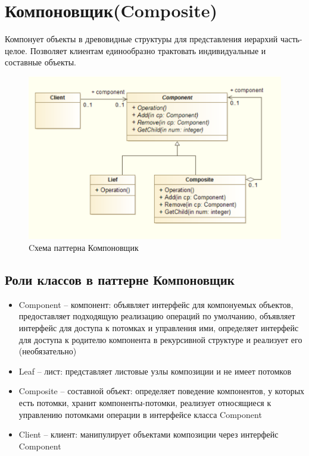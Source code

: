 \section{Компоновщик(Composite)}
Компонует объекты в древовидные структуры для представления иерархий
часть-целое. Позволяет клиентам единообразно трактовать индивидуальные
и составные объекты.
\begin{figure}[!ht]
\begin{center}
\includegraphics[scale=0.7]{images/pic/pic27-3.png}\caption{Cхема паттерна Компоновщик}\label{figure1}
\end{center}
\end{figure}
\subsection{Роли классов в паттерне Компоновщик}
\begin{itemize}
    \item Component – компонент: объявляет интерфейс для компонуемых объектов, предоставляет подходящую реализацию операций по умолчанию, объявляет интерфейс для доступа к потомках и управления ими, определяет интерфейс для доступа к родителю компонента в рекурсивной структуре и реализует его (необязательно)
    \item Leaf – лист: представляет листовые узлы композиции и не имеет потомков
    \item Composite – составной объект: определяет поведение компонентов, у которых есть потомки, хранит компоненты-потомки, реализует относящиеся к управлению потомками операции в интерфейсе класса Component
    \item Client – клиент: манипулирует объектами композиции через интерфейс Component
    \end{itemize}
